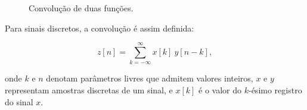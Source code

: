 \begin{figure}[ht!]
	\caption{Convolução de duas funções.}
	\vspace{1mm}	%
	\begin{center}
	\end{center}
	\vspace{1mm}	%
	\label{fig:2}
\end{figure}

Para sinais discretos, a convolução é assim definida:

\begin{equation}
z[n] = \sum_{k=-\infty}^{\infty} x[k] \ y[n-k],
\end{equation}

onde $k$ e $n$ denotam parâmetros livres que admitem valores inteiros, $x$ e $y$ representam amostras discretas de um sinal, e $x[k]$ é o valor do $k$-ésimo registro do sinal $x$.

